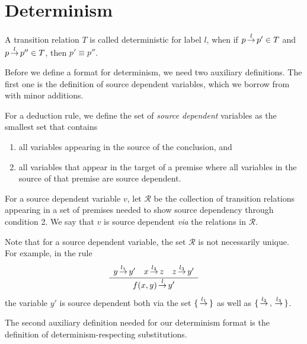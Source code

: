 \section{\label{sec::det}Determinism}
\begin{definition}[Determinism]
A transition relation $T$ is called deterministic for label $l$, when if
$p \,{\stackrel{{l}}{\rightarrow}}\, p' \in T$ and $p \,{\stackrel{{l}}{\rightarrow}}\, p'' \in T$, then $p' \equiv p''$.
\end{definition}

Before we define a format for determinism, we need two auxiliary definitions.
The first one is
the definition of source dependent variables,
which we borrow from~\cite{Mousavi05-ICALP} with minor additions.

\begin{definition}
For a deduction rule, we define the set of \emph{source dependent} variables as the smallest set that contains
\begin{enumerate}
    \item all variables appearing in the source of the conclusion, and
    \item all variables that appear in the target of a premise where all variables in the source of that premise are source dependent.
\end{enumerate}
For a source dependent variable $v$, let $\mathcal{R}$ be the collection of transition relations appearing in a set of premises needed to show source dependency through condition 2. We say that $v$ is source dependent \emph{via} the relations in $\mathcal{R}$.
\end{definition}

Note that for a source dependent variable, the set $\mathcal{R}$ is not necessarily unique. For example, in the rule
\[
    \sosrule{y\trans{l_1}y' \quad x\trans{l_2}z \quad z\trans{l_3}y'}{f(x,y) \trans{l} y'}
\]
the variable $y'$ is source dependent both via the set $\{\,{\stackrel{{l_1}}{\rightarrow}}\,\}$ as well as $\{\,{\stackrel{{l_2}}{\rightarrow}}\,,\,{\stackrel{{l_3}}{\rightarrow}}\,\}$.


The second auxiliary definition needed for our determinism format is the definition of determinism-respecting substitutions.

